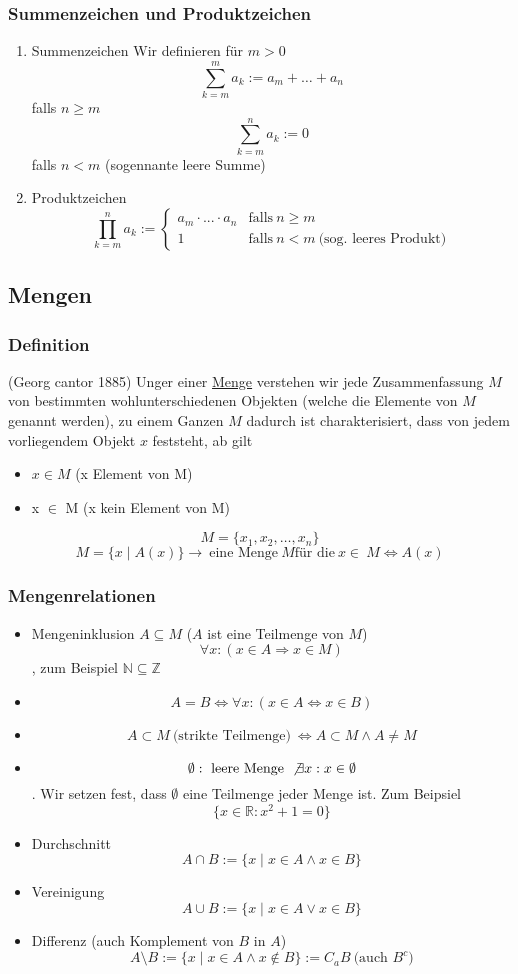 \documentclass[11pt]{article}
\DeclareMathOperator{\Forall}{\forall}%
\begin{document}
\subsubsection{Summenzeichen und Produktzeichen}
\label{sec-2-1-4}
\begin{enumerate}
\item Summenzeichen
\label{sec-2-1-4-1}
Wir definieren für $m > 0$ \[\sum_{k=m}^m a_k := a_m + \ldots + a_n\] falls $n\geq m$
\[\sum_{k=m}^n a_k := 0\] falls $n < m$ (sogennante leere Summe)
\item Produktzeichen
\label{sec-2-1-4-2}
\[\prod_{k=m}^n a_k := \begin{cases} a_m \cdot ... \cdot a_n & \text{falls}~n\geq m\\ 1 & \text{falls}~n<m~\text{(sog. leeres Produkt)}\end{cases}\]
\end{enumerate}
\subsection{Mengen}
\label{sec-2-2}
\subsubsection{Definition}
\label{sec-2-2-1}
(Georg cantor 1885) Unger einer \uline{Menge} verstehen wir jede Zusammenfassung $M$ von bestimmten wohlunterschiedenen Objekten (welche die Elemente von $M$ genannt werden), zu einem Ganzen
$M$ dadurch ist charakterisiert, dass von jedem vorliegendem Objekt $x$ feststeht, ab gilt
\begin{itemize}
\item $x\in M$ (x Element von M)
\item x \textlnot{}$\in$ M (x kein Element von M)
\end{itemize}
\[M = \{x_1, x_2, \ldots, x_n\}\]
\[M=\{x\mid A(x)\} \rightarrow~\text{eine Menge}~M\text{für die}~x\in\ M \Leftrightarrow A(x)\]
\subsubsection{Mengenrelationen}
\label{sec-2-2-2}
\begin{itemize}
\item Mengeninklusion $A\subseteq M$ ($A$ ist eine Teilmenge von $M$)
\[\Forall x: (x\in A \Rightarrow x\in M)\], zum Beispiel $\mathbb{N} \subseteq \mathbb{Z}$
\item \[A = B \Leftrightarrow \Forall x: (x\in A \Leftrightarrow x\in B)\]
\item \[A \subset M~\text{(strikte Teilmenge)}~\Leftrightarrow A\subset M \wedge A \neq M\]
\item \[\emptyset:~\text{leere Menge}~\not\exists x: x\in\emptyset\]. Wir setzen fest, dass $\emptyset$ eine Teilmenge jeder Menge ist. Zum Beipsiel \[\{x\in\mathbb{R}: x^2 + 1 = 0\}\]
\item Durchschnitt \[A\cap B := \{x\mid x\in A \wedge x\in B\}\]
\item Vereinigung \[A\cup B := \{x \mid x\in A \vee x\in B\}\]
\item Differenz (auch Komplement von $B$ in $A$) \[A\setminus B := \{x\mid x\in A \wedge x\not\in B\} := C_a B~\text{(auch $B^c$)}\]
\end{itemize}
\end{document}
